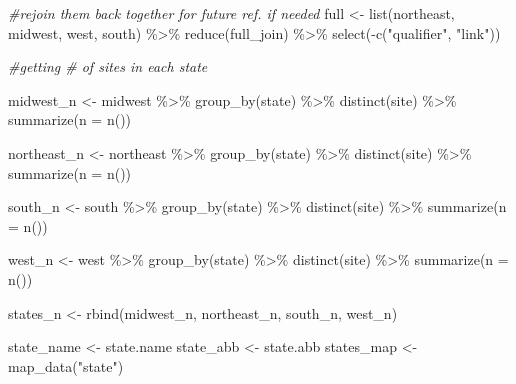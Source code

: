 \documentclass[12pt, twoside]{amherstthesis}
\newenvironment{Shaded}{\begin{snugshade}}{\end{snugshade}}
\newcommand{\AttributeTok}[1]{\textcolor[rgb]{0.77,0.63,0.00}{#1}}
\newcommand{\CommentTok}[1]{\textcolor[rgb]{0.56,0.35,0.01}{\textit{#1}}}
\newcommand{\FunctionTok}[1]{\textcolor[rgb]{0.00,0.00,0.00}{#1}}
\newcommand{\NormalTok}[1]{#1}
\newcommand{\OtherTok}[1]{\textcolor[rgb]{0.56,0.35,0.01}{#1}}
\newcommand{\SpecialCharTok}[1]{\textcolor[rgb]{0.00,0.00,0.00}{#1}}
\newcommand{\StringTok}[1]{\textcolor[rgb]{0.31,0.60,0.02}{#1}}
\begin{document}
\begin{Shaded}
\begin{Highlighting}[]
\CommentTok{\#rejoin them back together for future ref. if needed}
\NormalTok{full }\OtherTok{\textless{}{-}} \FunctionTok{list}\NormalTok{(northeast, midwest, west, south) }\SpecialCharTok{\%\textgreater{}\%} 
  \FunctionTok{reduce}\NormalTok{(full\_join) }\SpecialCharTok{\%\textgreater{}\%}
  \FunctionTok{select}\NormalTok{(}\SpecialCharTok{{-}}\FunctionTok{c}\NormalTok{(}\StringTok{"qualifier"}\NormalTok{, }\StringTok{"link"}\NormalTok{))}

\CommentTok{\#getting \# of sites in each state}

\NormalTok{midwest\_n }\OtherTok{\textless{}{-}}\NormalTok{ midwest }\SpecialCharTok{\%\textgreater{}\%}
  \FunctionTok{group\_by}\NormalTok{(state) }\SpecialCharTok{\%\textgreater{}\%}
  \FunctionTok{distinct}\NormalTok{(site) }\SpecialCharTok{\%\textgreater{}\%}
  \FunctionTok{summarize}\NormalTok{(}\AttributeTok{n =} \FunctionTok{n}\NormalTok{())}

\NormalTok{northeast\_n }\OtherTok{\textless{}{-}}\NormalTok{ northeast }\SpecialCharTok{\%\textgreater{}\%}
  \FunctionTok{group\_by}\NormalTok{(state) }\SpecialCharTok{\%\textgreater{}\%}
  \FunctionTok{distinct}\NormalTok{(site) }\SpecialCharTok{\%\textgreater{}\%}
  \FunctionTok{summarize}\NormalTok{(}\AttributeTok{n =} \FunctionTok{n}\NormalTok{())}

\NormalTok{south\_n }\OtherTok{\textless{}{-}}\NormalTok{ south }\SpecialCharTok{\%\textgreater{}\%}
  \FunctionTok{group\_by}\NormalTok{(state) }\SpecialCharTok{\%\textgreater{}\%}
  \FunctionTok{distinct}\NormalTok{(site) }\SpecialCharTok{\%\textgreater{}\%}
  \FunctionTok{summarize}\NormalTok{(}\AttributeTok{n =} \FunctionTok{n}\NormalTok{())}

\NormalTok{west\_n }\OtherTok{\textless{}{-}}\NormalTok{ west }\SpecialCharTok{\%\textgreater{}\%}
  \FunctionTok{group\_by}\NormalTok{(state) }\SpecialCharTok{\%\textgreater{}\%}
  \FunctionTok{distinct}\NormalTok{(site) }\SpecialCharTok{\%\textgreater{}\%}
  \FunctionTok{summarize}\NormalTok{(}\AttributeTok{n =} \FunctionTok{n}\NormalTok{())}

\NormalTok{states\_n }\OtherTok{\textless{}{-}} \FunctionTok{rbind}\NormalTok{(midwest\_n, northeast\_n, south\_n, west\_n)}

\NormalTok{state\_name }\OtherTok{\textless{}{-}}\NormalTok{ state.name}
\NormalTok{state\_abb }\OtherTok{\textless{}{-}}\NormalTok{ state.abb}
\NormalTok{states\_map }\OtherTok{\textless{}{-}} \FunctionTok{map\_data}\NormalTok{(}\StringTok{"state"}\NormalTok{)}
\end{Highlighting}
\end{Shaded}
\end{document}
